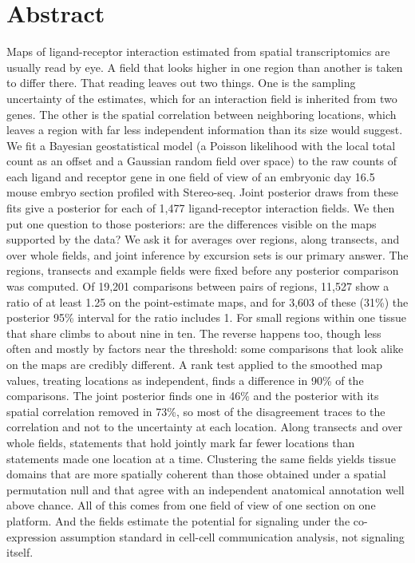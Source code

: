 \documentclass[10pt,letterpaper]{article}
\begin{document}
\section*{Abstract}
Maps of ligand-receptor interaction estimated from spatial transcriptomics are usually read by eye. A field that looks higher in one region than another is taken to differ there. That reading leaves out two things. One is the sampling uncertainty of the estimates, which for an interaction field is inherited from two genes. The other is the spatial correlation between neighboring locations, which leaves a region with far less independent information than its size would suggest. We fit a Bayesian geostatistical model (a Poisson likelihood with the local total count as an offset and a Gaussian random field over space) to the raw counts of each ligand and receptor gene in one field of view of an embryonic day 16.5 mouse embryo section profiled with Stereo-seq. Joint posterior draws from these fits give a posterior for each of 1,477 ligand-receptor interaction fields. We then put one question to those posteriors: are the differences visible on the maps supported by the data? We ask it for averages over regions, along transects, and over whole fields, and joint inference by excursion sets is our primary answer. The regions, transects and example fields were fixed before any posterior comparison was computed. Of 19,201 comparisons between pairs of regions, 11,527 show a ratio of at least 1.25 on the point-estimate maps, and for 3,603 of these (31\%) the posterior 95\% interval for the ratio includes 1. For small regions within one tissue that share climbs to about nine in ten. The reverse happens too, though less often and mostly by factors near the threshold: some comparisons that look alike on the maps are credibly different. A rank test applied to the smoothed map values, treating locations as independent, finds a difference in 90\% of the comparisons. The joint posterior finds one in 46\% and the posterior with its spatial correlation removed in 73\%, so most of the disagreement traces to the correlation and not to the uncertainty at each location. Along transects and over whole fields, statements that hold jointly mark far fewer locations than statements made one location at a time. Clustering the same fields yields tissue domains that are more spatially coherent than those obtained under a spatial permutation null and that agree with an independent anatomical annotation well above chance. All of this comes from one field of view of one section on one platform. And the fields estimate the potential for signaling under the co-expression assumption standard in cell-cell communication analysis, not signaling itself.
\end{document}
